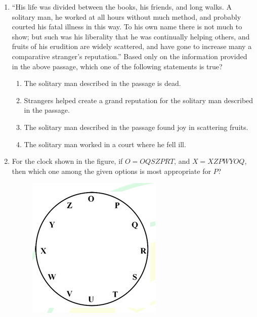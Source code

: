 \documentclass[journal]{IEEEtran}
\begin{document}
\begin{enumerate}
    \item ``His life was divided between the books, his friends, and long walks. A solitary man, he worked at all hours without much method, and probably courted his fatal illness in this way. To his own name there is not much to show; but such was his liberality that he was continually helping others, and fruits of his erudition are widely scattered, and have gone to increase many a comparative stranger's reputation.''  Based only on the information provided in the above passage, which one of the following statements is true?

    \hfill{}

    \begin{enumerate}
        \item The solitary man described in the passage is dead.
        \item Strangers helped create a grand reputation for the solitary man described in the passage.
        \item The solitary man described in the passage found joy in scattering fruits.
        \item The solitary man worked in a court where he fell ill.
    \end{enumerate}

    \item For the clock shown in the figure, if $O = OQSZPRT$, and $X = XZPWYOQ$, then which one among the given options is most appropriate for $P$?

    \begin{figure}[H]
        \centering
        \includegraphics[width=0.8\columnwidth]{figs/q7.png}
        \caption*{}
        \label{fig:q7}
    \end{figure}


\end{enumerate}
\end{document}
